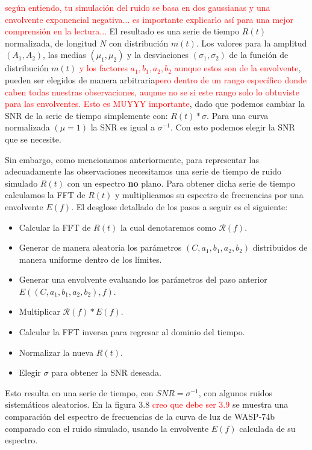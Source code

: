 \textcolor{red}{según entiendo, tu simulación del ruido se basa en dos gaussianas y una envolvente exponencial negativa... es importante explicarlo así para una mejor comprensión en la lectura... }El resultado es una serie de tiempo $R(t)$ normalizada, de longitud $N$ con distribución $m(t)$. Los valores para la amplitud $(A_{1},A_{2})$, las medias   $(\mu_{1},\mu_{2})$ y la desviaciones $(\sigma_{1},\sigma_{2})$ de la función de distribución $m(t)$ \textcolor{red}{y los factores $a_1,b_1,a_2,b_2$ aunque estos son de la envolvente}, pueden ser elegidos de manera arbitraria\textcolor{red}{pero dentro de un rango específico donde caben todas nuestras observaciones, auqnue no se si este rango solo lo obtuviste para las envolventes. Esto es MUYYY importante}, dado que podemos cambiar la SNR de la serie de tiempo simplemente con: $R(t)*\sigma$. Para una curva normalizada $(\mu=1)$ la SNR es igual a $\sigma^{-1}$. Con esto podemos elegir la SNR que se necesite.

Sin embargo, como mencionamos anteriormente, para representar las adecuadamente las observaciones necesitamos una serie de tiempo de ruido simulado $R(t)$ con un espectro \textbf{no}  plano. Para obtener dicha serie de tiempo calculamos la FFT de $R(t)$ y multiplicamos su espectro de frecuencias por una envolvente $E(f)$. El desglose detallado de los pasos a seguir es el siguiente:

\begin{itemize}
  \item Calcular la FFT de $R(t)$ la cual denotaremos como $\mathcal{R}(f)$.
  \item Generar de manera aleatoria los parámetros $(C,a_{1},b_{1},a_{2},b_{2})$ distribuidos de manera uniforme dentro de los límites.
  \item Generar una envolvente evaluando los parámetros del paso anterior $E((C,a_{1},b_{1},a_{2},b_{2}),f)$.
  \item Multiplicar $\mathcal{R}(f)*E(f)$.
  \item Calcular la FFT inversa para regresar al dominio del tiempo.
  \item Normalizar la nueva $R(t)$.
  \item Elegir $\sigma$ para obtener la SNR deseada.
\end{itemize}

Esto resulta en una serie de tiempo, con $SNR=\sigma^{-1}$, con algunos ruidos sistemáticos aleatorios. En la figura 3.8\textcolor{red}{ creo que debe ser 3.9} se muestra una comparación del espectro de frecuencias de la curva de luz de WASP-74b comparado con el ruido simulado, usando la envolvente $E(f)$ calculada de su espectro.

